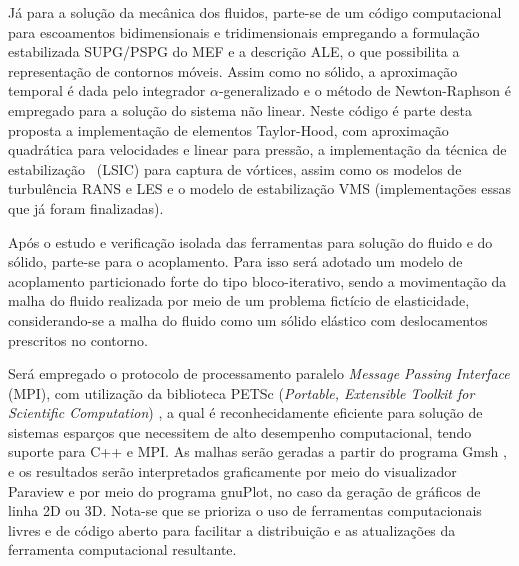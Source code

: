 Já para a solução da mecânica dos fluidos, parte-se de um código computacional para escoamentos bidimensionais e tridimensionais empregando a formulação estabilizada SUPG/PSPG do MEF e a descrição ALE, o que possibilita a representação de contornos móveis. Assim como no sólido, a aproximação temporal é dada pelo integrador $\alpha$-generalizado e o método de Newton-Raphson é empregado para a solução do sistema não linear. Neste código é parte desta proposta a implementação de elementos Taylor-Hood, com aproximação quadrática para velocidades e linear para pressão, a implementação da técnica de estabilização \LSIC\ (LSIC) para captura de vórtices, assim como os modelos de turbulência RANS e LES e o modelo de estabilização VMS (implementações essas que já foram finalizadas).

Após o estudo e verificação isolada das ferramentas para solução do fluido e do sólido, parte-se para o acoplamento.
Para isso será adotado um modelo de acoplamento particionado forte do tipo bloco-iterativo, sendo a movimentação da malha do fluido realizada por meio de um problema fictício de elasticidade, considerando-se a malha do fluido como um sólido elástico com deslocamentos prescritos no contorno.

Será empregado o protocolo de processamento paralelo \textit{Message Passing Interface} (MPI), com utilização da biblioteca PETSc (\textit{Portable, Extensible Toolkit for Scientific Computation}) \cite{petsc-web-page}, a qual é reconhecidamente eficiente para solução de sistemas esparços que necessitem de alto desempenho computacional, tendo suporte para C++ e MPI.  As malhas serão geradas a partir do programa Gmsh \cite{geuzaine2009gmsh}, e os resultados serão interpretados graficamente por meio do visualizador Paraview \cite{ahrens2005paraview} e por meio do programa gnuPlot, no caso da geração de gráficos de linha 2D ou 3D. Nota-se que se prioriza o uso de ferramentas computacionais livres e de código aberto para facilitar a distribuição e as atualizações da ferramenta computacional resultante.